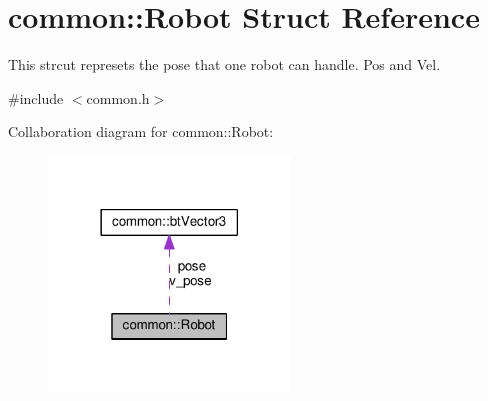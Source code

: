\hypertarget{structcommon_1_1Robot}{}\section{common\+:\+:Robot Struct Reference}
\label{structcommon_1_1Robot}


This strcut represets the pose that one robot can handle. Pos and Vel.  




{\ttfamily \#include $<$common.\+h$>$}



Collaboration diagram for common\+:\+:Robot\+:\nopagebreak
\begin{figure}[H]
\begin{center}
\leavevmode
\includegraphics[width=182pt]{structcommon_1_1Robot__coll__graph}
\end{center}
\end{figure}
